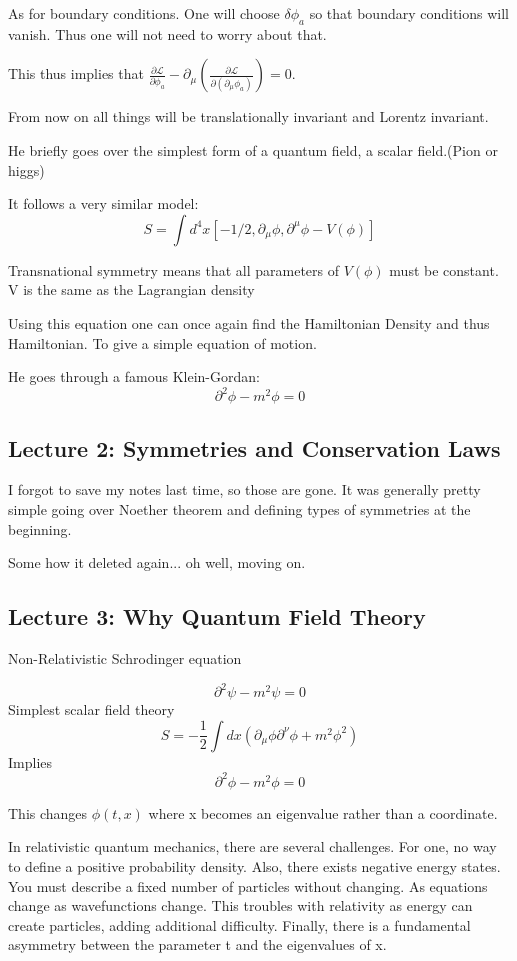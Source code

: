   As for boundary conditions. One will choose $\delta \phi_a $ so that boundary conditions will vanish. Thus one will not need to worry about that.

This thus implies that $ \frac{\partial \mathcal{L}}{\partial \phi_a} - \partial_\mu \left( \frac{\partial \mathcal{L}}{\partial(\partial_\mu \phi_a)} \right) = 0$.

From now on all things will be translationally invariant and Lorentz invariant.

He briefly goes over the simplest form of a quantum field, a scalar field.(Pion or higgs)

It follows a very similar model:
\[
S = \int d^4 x \left[ -1/2, \partial_\mu \phi, \partial^\mu \phi - V(\phi) \right]
  \]

  Transnational symmetry means that all parameters of $V(\phi)$ must be constant. V is the same as the Lagrangian density

Using this equation one can once again find the Hamiltonian Density and thus Hamiltonian. To give a simple equation of motion.

He goes through a famous Klein-Gordan:
\[
\partial^2 \phi - m^2 \phi = 0
  \]
\subsection{Lecture 2: Symmetries and Conservation Laws}

I forgot to save my notes last time, so those are gone. It was generally pretty simple going over Noether theorem and defining types of symmetries at the beginning.

Some how it deleted again... oh well, moving on.

\subsection{Lecture 3: Why Quantum Field Theory}

Non-Relativistic Schrodinger equation

\[
\partial^2 \psi - m^2 \psi = 0
  \]
  Simplest scalar field theory
\[
S= - \frac 12 \int dx (\partial_\mu \phi \partial^\nu \phi + m^2 \phi^2)
  \]
  Implies
\[
\partial^2 \phi -m^2 \phi = 0
  \]

  This changes $\phi(t, x)$ where x becomes an eigenvalue rather than a coordinate.

In relativistic quantum mechanics, there are several challenges. For one, no way to define a positive probability density. Also, there exists negative energy states. You must describe a fixed number of particles without changing. As equations change as wavefunctions change. This troubles with relativity as energy can create particles, adding additional difficulty. Finally, there is a fundamental asymmetry between the parameter t and the eigenvalues of x.

